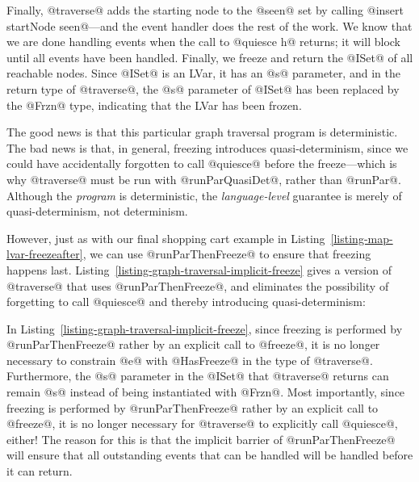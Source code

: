 Finally, @traverse@ adds the starting node to the @seen@ set by
calling @insert startNode seen@---and the event handler does the rest
of the work.  We know that we are done handling events when the call
to @quiesce h@ returns; it will block until all events have been
handled.  Finally, we freeze and return the @ISet@ of all reachable
nodes.  Since @ISet@ is an LVar, it has an @s@ parameter, and in the
return type of @traverse@, the @s@ parameter of @ISet@ has been
replaced by the @Frzn@ type, indicating that the LVar has been frozen.

The good news is that this particular graph traversal program is
deterministic.  The bad news is that, in general, freezing introduces
quasi-determinism, since we could have accidentally forgotten to call
@quiesce@ before the freeze---which is why @traverse@ must be run with
@runParQuasiDet@, rather than @runPar@.  Although the \emph{program}
is deterministic, the \emph{language-level} guarantee is merely of
quasi-determinism, not determinism.

However, just as with our final shopping cart example in
Listing~\ref{listing-map-lvar-freezeafter}, we can use
@runParThenFreeze@ to ensure that freezing happens last.
Listing~\ref{listing-graph-traversal-implicit-freeze} gives a version
of @traverse@ that uses @runParThenFreeze@, and eliminates the
possibility of forgetting to call @quiesce@ and thereby introducing
quasi-determinism:

\singlespacing

\doublespacing

In Listing~\ref{listing-graph-traversal-implicit-freeze}, since
freezing is performed by @runParThenFreeze@ rather by an explicit call
to @freeze@, it is no longer necessary to constrain @e@ with
@HasFreeze@ in the type of @traverse@.  Furthermore, the @s@ parameter
in the @ISet@ that @traverse@ returns can remain @s@ instead of being
instantiated with @Frzn@.  Most importantly, since freezing is
performed by @runParThenFreeze@ rather by an explicit call to
@freeze@, it is no longer necessary for @traverse@ to explicitly call
@quiesce@, either!  The reason for this is that the implicit barrier
of @runParThenFreeze@ will ensure that all outstanding events that can
be handled will be handled before it can return.
